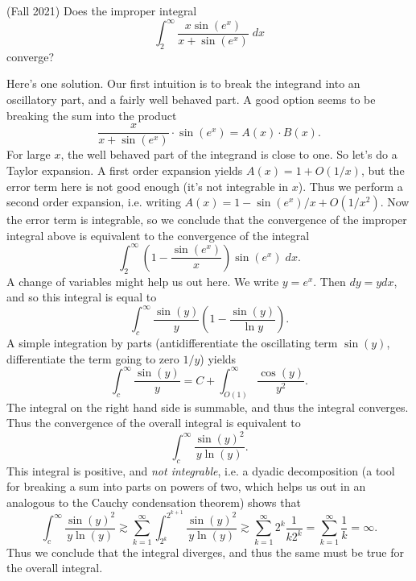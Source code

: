 \documentclass{exam}
\theoremstyle{problemstyle}
\newcommand{\1}[1]{\textbf{1}_{\left[#1\right]}} %
\begin{document}
\begin{questions}
\question (Fall 2021) Does the improper integral
%
\[ \int_2^\infty \frac{x \sin(e^x)}{x + \sin(e^x)}\; dx \]
%
converge?
\begin{solution}
	Here's one solution. Our first intuition is to break the integrand into an oscillatory part, and a fairly well behaved part. A good option seems to be breaking the sum into the product
	\[ \frac{x}{x + \sin(e^x)} \cdot \sin(e^x) = A(x) \cdot B(x). \]
	For large $x$, the well behaved part of the integrand is close to one. So let's do a Taylor expansion. A first order expansion yields $A(x) = 1 + O(1/x)$, but the error term here is not good enough (it's not integrable in $x$). Thus we perform a second order expansion, i.e. writing $A(x) = 1 - \sin(e^x) / x + O(1/x^2)$. Now the error term is integrable, so we conclude that the convergence of the improper integral above is equivalent to the convergence of the integral
	\[ \int_2^\infty \left( 1 - \frac{\sin(e^x)}{x} \right) \sin(e^x)\; dx. \]
	A change of variables might help us out here. We write $y = e^x$. Then $dy = y dx$, and so this integral is equal to
	\[ \int_c^\infty \frac{\sin(y)}{y} \left( 1 - \frac{\sin(y)}{\ln y} \right). \]
	A simple integration by parts (antidifferentiate the oscillating term $\sin(y)$, differentiate the term going to zero $1/y$) yields
	\[ \int_c^\infty \frac{\sin(y)}{y} = C + \int_{O(1)}^\infty \frac{\cos(y)}{y^2}. \]
	The integral on the right hand side is summable, and thus the integral converges. Thus the convergence of the overall integral is equivalent to
	\[ \int_c^\infty \frac{\sin(y)^2}{y \ln(y)}. \]
	This integral is positive, and \emph{not integrable}, i.e. a dyadic decomposition (a tool for breaking a sum into parts on powers of two, which helps us out in an analogous to the Cauchy condensation theorem) shows that
	\[ \int_c^\infty \frac{\sin(y)^2}{y \ln(y)} \gtrsim \sum_{k = 1}^\infty \int_{2^k}^{2^{k+1}} \frac{\sin(y)^2}{y \ln(y)} \gtrsim \sum_{k = 1}^\infty 2^k \frac{1}{k 2^k} = \sum_{k = 1}^\infty \frac{1}{k} = \infty. \]
	Thus we conclude that the integral diverges, and thus the same must be true for the overall integral.


\end{solution}
\end{questions}
\end{document}
